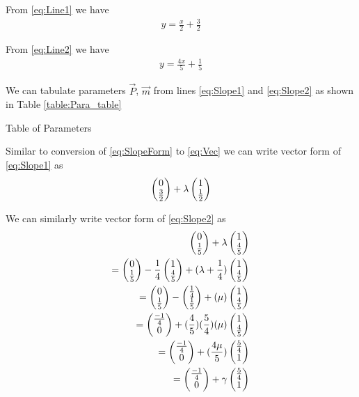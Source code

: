 \documentclass[journal,12pt,twocolumn]{IEEEtran}
\begin{document}
From
\eqref{eq:Line1}
we have
\begin{align}
  y = \frac{x}{2} + \frac{3}{2}
  \label{eq:Slope1}
\end{align} 

From
\eqref{eq:Line2}
we have
\begin{align}
  y = \frac{4x}{5} + \frac{1}{5}
  \label{eq:Slope2}
\end{align}

We can tabulate parameters $\vec{P}$, $\vec{m}$ from lines
\eqref{eq:Slope1}
and
\eqref{eq:Slope2}
as shown in Table
\eqref{table:Para_table}

\begin{table}[!ht]
  \centering
  
  \caption{Table of Parameters}
  \label{table:Para_table}	
\end{table}


Similar to conversion of
\eqref{eq:SlopeForm}
to
\eqref{eq:Vec}
we can write vector form of
\eqref{eq:Slope1}
as
\begin{align}
  \begin{pmatrix}0\\\frac{3}{2}\end{pmatrix} + \lambda\begin{pmatrix}1\\\frac{1}{2}\end{pmatrix}
  \label{eq:Vec1}  
\end{align}

We can similarly write vector form of
\eqref{eq:Slope2}
as
\begin{align}
  \begin{pmatrix}0\\\frac{1}{5}\end{pmatrix} + \lambda\begin{pmatrix}1\\\frac{4}{5}\end{pmatrix}
  \\
  = \begin{pmatrix}0\\\frac{1}{5}\end{pmatrix} - \frac{1}{4}\begin{pmatrix}1\\\frac{4}{5}\end{pmatrix} + (\lambda + \frac{1}{4})\begin{pmatrix}1\\\frac{4}{5}\end{pmatrix}
  \\
  = \begin{pmatrix}0\\\frac{1}{5}\end{pmatrix} - \begin{pmatrix}\frac{1}{4}\\\frac{1}{5}\end{pmatrix} + (\mu)\begin{pmatrix}1\\\frac{4}{5}\end{pmatrix}
  \\
  = \begin{pmatrix}\frac{-1}{4}\\0\end{pmatrix} + (\frac{4}{5})(\frac{5}{4})(\mu)\begin{pmatrix}1\\\frac{4}{5}\end{pmatrix}
  \\
  = \begin{pmatrix}\frac{-1}{4}\\0\end{pmatrix} + (\frac{4\mu}{5})\begin{pmatrix}\frac{5}{4}\\1\end{pmatrix}
  \\
  = \begin{pmatrix}\frac{-1}{4}\\0\end{pmatrix} + \gamma\begin{pmatrix}\frac{5}{4}\\1\end{pmatrix}
  \label{eq:Vec2}  
\end{align}
\end{document}
